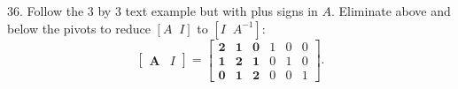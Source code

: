 36. Follow the 3 by 3 text example but with plus signs in \(A\). Eliminate above and below the pivots to reduce \([A\;\;I]\) to \([I\;\;A^{-1}]\): \[\begin{bmatrix}\boldsymbol{A}&I\end{bmatrix}=\begin{bmatrix}\mathbf{2}& \mathbf{1}&\mathbf{0}&1&0&0\\ \mathbf{1}&\mathbf{2}&\mathbf{1}&0&1&0\\ \mathbf{0}&\mathbf{1}&\mathbf{2}&0&0&1\end{bmatrix}.\] 
